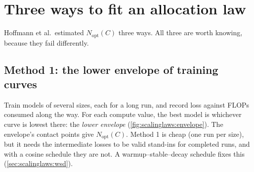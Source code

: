 \section{Three ways to fit an allocation law}\label{sec:scalinglaws:methods}

Hoffmann et al.\ estimated $N_{\text{opt}}(C)$ three ways. All three are worth knowing, because they
fail differently.

\subsection{Method 1: the lower envelope of training curves}\label{sec:scalinglaws:method1}

Train models of several sizes, each for a long run, and record loss against FLOPs consumed
along the way. For each compute value, the best model is whichever curve is lowest there: the
\emph{lower envelope} (\cref{fig:scalinglaws:envelope}). The envelope's contact points give
$N_{\text{opt}}(C)$. Method 1 is cheap (one run per size), but it needs the intermediate losses
to be valid stand-ins for completed runs, and with a cosine schedule they are not. A
warmup--stable--decay schedule fixes this (\cref{sec:scalinglaws:wsd}).

